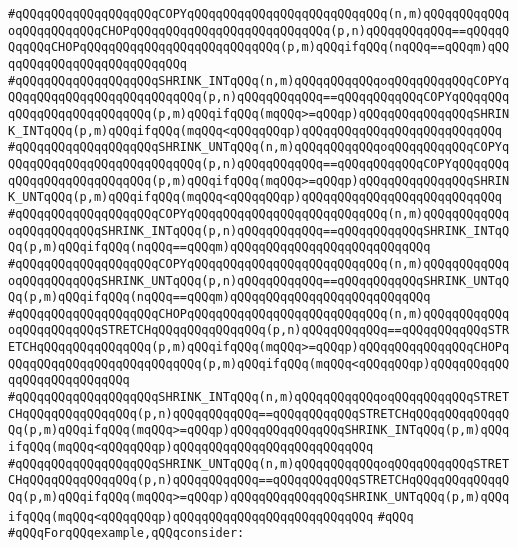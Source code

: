 \verb|#qQQqqQQqqQQqqQQqqQQqCOPYqQQqqQQqqQQqqQQqqQQqqQQqqQQq(n,m)qQQqqQQqqQQqoqQQqqQQqqQQqCHOPqQQqqQQqqQQqqQQqqQQqqQQqqQQq(p,n)qQQqqQQqqQQq==qQQqqQQqqQQqCHOPqQQqqQQqqQQqqQQqqQQqqQQqqQQq(p,m)qQQqifqQQq(nqQQq==qQQqm)qQQqqQQqqQQqqQQqqQQqqQQqqQQq|\newline
\verb|#qQQqqQQqqQQqqQQqqQQqSHRINK_INTqQQq(n,m)qQQqqQQqqQQqoqQQqqQQqqQQqCOPYqQQqqQQqqQQqqQQqqQQqqQQqqQQq(p,n)qQQqqQQqqQQq==qQQqqQQqqQQqCOPYqQQqqQQqqQQqqQQqqQQqqQQqqQQq(p,m)qQQqifqQQq(mqQQq>=qQQqp)qQQqqQQqqQQqqQQqSHRINK_INTqQQq(p,m)qQQqifqQQq(mqQQq<qQQqqQQqp)qQQqqQQqqQQqqQQqqQQqqQQqqQQq|\newline
\verb|#qQQqqQQqqQQqqQQqqQQqSHRINK_UNTqQQq(n,m)qQQqqQQqqQQqoqQQqqQQqqQQqCOPYqQQqqQQqqQQqqQQqqQQqqQQqqQQq(p,n)qQQqqQQqqQQq==qQQqqQQqqQQqCOPYqQQqqQQqqQQqqQQqqQQqqQQqqQQq(p,m)qQQqifqQQq(mqQQq>=qQQqp)qQQqqQQqqQQqqQQqSHRINK_UNTqQQq(p,m)qQQqifqQQq(mqQQq<qQQqqQQqp)qQQqqQQqqQQqqQQqqQQqqQQqqQQq|\newline
\verb|#qQQqqQQqqQQqqQQqqQQqCOPYqQQqqQQqqQQqqQQqqQQqqQQqqQQq(n,m)qQQqqQQqqQQqoqQQqqQQqqQQqSHRINK_INTqQQq(p,n)qQQqqQQqqQQq==qQQqqQQqqQQqSHRINK_INTqQQq(p,m)qQQqifqQQq(nqQQq==qQQqm)qQQqqQQqqQQqqQQqqQQqqQQqqQQq|\newline
\verb|#qQQqqQQqqQQqqQQqqQQqCOPYqQQqqQQqqQQqqQQqqQQqqQQqqQQq(n,m)qQQqqQQqqQQqoqQQqqQQqqQQqSHRINK_UNTqQQq(p,n)qQQqqQQqqQQq==qQQqqQQqqQQqSHRINK_UNTqQQq(p,m)qQQqifqQQq(nqQQq==qQQqm)qQQqqQQqqQQqqQQqqQQqqQQqqQQq|\newline
\verb|#qQQqqQQqqQQqqQQqqQQqCHOPqQQqqQQqqQQqqQQqqQQqqQQqqQQq(n,m)qQQqqQQqqQQqoqQQqqQQqqQQqSTRETCHqQQqqQQqqQQqqQQq(p,n)qQQqqQQqqQQq==qQQqqQQqqQQqSTRETCHqQQqqQQqqQQqqQQq(p,m)qQQqifqQQq(mqQQq>=qQQqp)qQQqqQQqqQQqqQQqCHOPqQQqqQQqqQQqqQQqqQQqqQQqqQQq(p,m)qQQqifqQQq(mqQQq<qQQqqQQqp)qQQqqQQqqQQqqQQqqQQqqQQqqQQq|\newline
\verb|#qQQqqQQqqQQqqQQqqQQqSHRINK_INTqQQq(n,m)qQQqqQQqqQQqoqQQqqQQqqQQqSTRETCHqQQqqQQqqQQqqQQq(p,n)qQQqqQQqqQQq==qQQqqQQqqQQqSTRETCHqQQqqQQqqQQqqQQq(p,m)qQQqifqQQq(mqQQq>=qQQqp)qQQqqQQqqQQqqQQqSHRINK_INTqQQq(p,m)qQQqifqQQq(mqQQq<qQQqqQQqp)qQQqqQQqqQQqqQQqqQQqqQQqqQQq|\newline
\verb|#qQQqqQQqqQQqqQQqqQQqSHRINK_UNTqQQq(n,m)qQQqqQQqqQQqoqQQqqQQqqQQqSTRETCHqQQqqQQqqQQqqQQq(p,n)qQQqqQQqqQQq==qQQqqQQqqQQqSTRETCHqQQqqQQqqQQqqQQq(p,m)qQQqifqQQq(mqQQq>=qQQqp)qQQqqQQqqQQqqQQqSHRINK_UNTqQQq(p,m)qQQqifqQQq(mqQQq<qQQqqQQqp)qQQqqQQqqQQqqQQqqQQqqQQqqQQq|\newline
\verb|#qQQq|\newline
\verb|#qQQqForqQQqexample,qQQqconsider:|\newline
